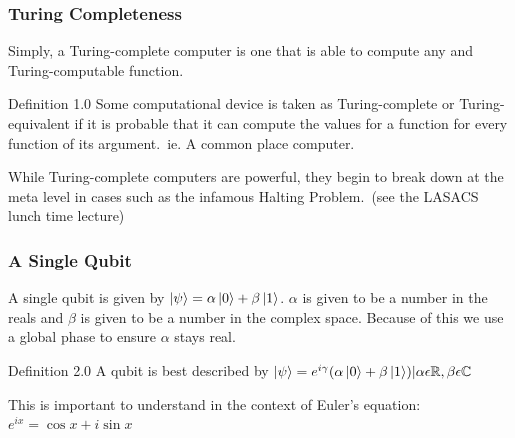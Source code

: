 \documentclass{beamer}
\begin{document}
\begin{frame}
\frametitle{Turing Completeness}

Simply, a Turing-complete computer is one that is able to compute any and Turing-computable function.

\begin{block}{Definition 1.0}
  Some computational device is taken as Turing-complete or Turing-equivalent if it is probable that it can compute the values for a function for every function of its argument.\ ie. A common place computer.
\end{block}

While Turing-complete computers are powerful, they begin to break down at the meta level in cases such as the infamous Halting Problem.\ (see the LASACS lunch time lecture)

\end{frame}



\begin{frame}
\frametitle{A Single Qubit}

A single qubit is given by $\ket{\psi} = \alpha\ket{0} + \beta\ket{1}$.
\newline
\newline
$\alpha$ is given to be a number in the reals and $\beta$ is given to be a number in the complex space. Because of this we use a global phase to ensure $\alpha$ stays real.
\newline

\begin{block}{Definition 2.0}
  A qubit is best described by $\ket{\psi} = e^{i\gamma}(\alpha\ket{0} + \beta\ket{1}) | \alpha \epsilon 
  \mathbb{R}, \beta \epsilon \mathbb{C}$
\end{block}

This is important to understand in the context of Euler's equation:
$e^{ix} = \cos{x} + i\sin{x}$

\end{frame}
\end{document}
